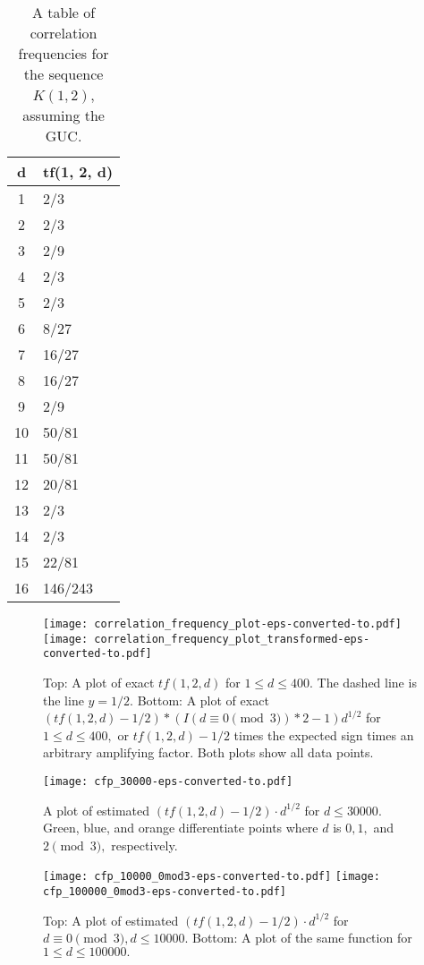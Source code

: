 \documentclass[11pt]{amsart} %
\begin{document}
\begin{table}[h]
	\centering
	\caption{A table of correlation frequencies for the sequence $K(1,2)$, assuming the GUC.}
	\begin{tabular}{cl}
		\hline
		d & tf(1, 2, d)\\
		\hline
		1 &  2/3 \\
		2 &  2/3 \\
		3 & 2/9 \\
		4 & 2/3 \\
		5 &  2/3 \\
		6 &  8/27 \\
		7 &16/27 \\
		8 &16/27 \\
		9 &2/9 \\
		10 & 50/81 \\
		11 &  50/81 \\
		12 & 20/81 \\
		13 &2/3 \\
		14 & 2/3 \\
		15 & 22/81 \\
		16 & 146/243 \\
		\hline
	\end{tabular}
	\label{tab:diffs}
\end{table}

\begin{figure}[htbp]
	\centering
    \texttt{[image: correlation\_frequency\_plot-eps-converted-to.pdf]}
       \texttt{[image: correlation\_frequency\_plot\_transformed-eps-converted-to.pdf]}
    \caption{Top: A plot of exact $tf(1, 2, d)$ for $1\leq d\leq 400$. The dashed line is the line $y=1/2$. Bottom: A plot of exact $(tf(1,2,d) - 1/2) * \left(I(d \equiv 0 \pmod{3}) * 2 - 1\right) d^{1/2}$ for $1 \leq d \leq 400,$ or $tf(1,2,d)-1/2$ times the expected sign times an arbitrary amplifying factor. Both plots show all data points.}
    \label{fig:tf12d}
\end{figure}

\begin{figure}[htbp]
	\centering
    \texttt{[image: cfp\_30000-eps-converted-to.pdf]}
    \caption{A plot of estimated $(tf(1,2,d) - 1/2) \cdot d^{1/2}$ for $d \leq 30000.$ Green, blue, and orange differentiate points where $d$ is $0, 1,$ and $2 \pmod{3},$ respectively.}
    \label{fig:tf12d-est}
\end{figure}

\begin{figure}[htbp]
	\centering
    \texttt{[image: cfp\_10000\_0mod3-eps-converted-to.pdf]}
        \texttt{[image: cfp\_100000\_0mod3-eps-converted-to.pdf]}
    \caption{Top: A plot of estimated $(tf(1,2,d) - 1/2) \cdot d^{1/2}$ for $d \equiv 0 \pmod{3},d \leq 10000.$ Bottom: A plot of the same function for $1 \leq d \leq 100000.$ }
    \label{fig:tf12d-est1}
\end{figure}
\end{document}
